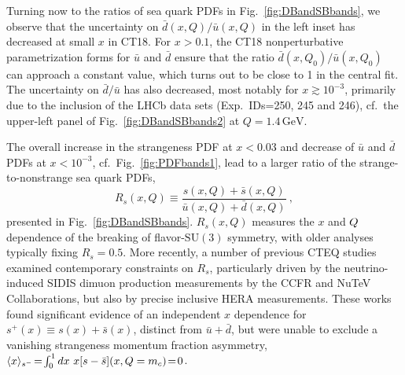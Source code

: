 
Turning now to the ratios of sea quark PDFs in
Fig.~\ref{fig:DBandSBbands}, we observe that the uncertainty on $\bar
d(x,Q)/\bar u(x,Q)$ in the left inset has decreased at small $x$
in CT18. For $x\! >\! 0.1$, the CT18 nonperturbative parametrization forms for $\bar u$ and $\bar d$ ensure that the ratio
$\bar d(x,Q_0)/\bar u(x,Q_0)$ can approach a constant value, which
turns out to be close to 1 in the central fit. The uncertainty on
$\bar d/\bar u$ has also decreased, most notably for $x\! \gtrsim\! 10^{-3}$, primarily due to the inclusion
of the LHCb data sets (Exp.~IDs=250, 245 and 246), cf.~the upper-left panel of Fig.~\ref{fig:DBandSBbands2} at $Q\!=\!1.4\,\mathrm{GeV}$.


The overall increase in the strangeness PDF at $ x < 0.03$ and decrease of $\bar u$ and $\bar d$ PDFs at $ x  < 10 ^{-3}$, cf.~Fig.~\ref{fig:PDFbands1}, lead to a
larger ratio of the strange-to-nonstrange sea quark PDFs,
\begin{equation}
	R_s(x,Q) \equiv \frac{s(x,Q) + \bar{s}(x,Q)}{\bar{u}(x,Q) + \bar{d}(x,Q)}\ ,
\label{eq:Rs}
\end{equation}
presented in
Fig.~\ref{fig:DBandSBbands}. 
$R_s(x,Q)$ measures the $x$ and $Q$ dependence of the breaking of flavor-$\mathrm{SU}(3)$ symmetry,
with older analyses typically fixing $R_s = 0.5$. More recently, a number of previous CTEQ
studies \cite{Lai:2007dq,Olness:2003wz} examined contemporary constraints on $R_s$,
particularly driven by the neutrino-induced SIDIS dimuon production measurements by the CCFR and NuTeV Collaborations, but also by precise inclusive HERA measurements. 
These works found significant evidence of an independent $x$ dependence for $s^+(x)\! \equiv\! s(x)\! +\! \bar{s}(x)$, distinct from $\bar{u}\!+\!\bar{d}$, 
but were unable to exclude a vanishing strangeness momentum fraction  asymmetry,
$\langle x \rangle_{s^-}\! =\! \int^1_0 dx\ x [s-\bar{s}](x,Q=m_c)\! =\! 0$.
%
%

